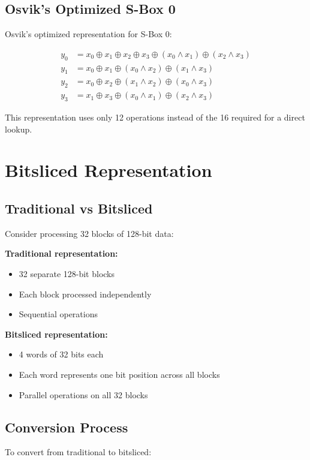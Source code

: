 \documentclass[12pt,a4paper]{article}
\begin{document}
\subsection{Osvik's Optimized S-Box 0}
Osvik's optimized representation for S-Box 0:

\begin{align}
y_0 &= x_0 \oplus x_1 \oplus x_2 \oplus x_3 \oplus (x_0 \land x_1) \oplus (x_2 \land x_3) \\
y_1 &= x_0 \oplus x_1 \oplus (x_0 \land x_2) \oplus (x_1 \land x_3) \\
y_2 &= x_0 \oplus x_2 \oplus (x_1 \land x_2) \oplus (x_0 \land x_3) \\
y_3 &= x_1 \oplus x_3 \oplus (x_0 \land x_1) \oplus (x_2 \land x_3)
\end{align}

This representation uses only 12 operations instead of the 16 required for a direct lookup.

\section{Bitsliced Representation}

\subsection{Traditional vs Bitsliced}
Consider processing 32 blocks of 128-bit data:

\textbf{Traditional representation:}
\begin{itemize}
    \item 32 separate 128-bit blocks
    \item Each block processed independently
    \item Sequential operations
\end{itemize}

\textbf{Bitsliced representation:}
\begin{itemize}
    \item 4 words of 32 bits each
    \item Each word represents one bit position across all blocks
    \item Parallel operations on all 32 blocks
\end{itemize}

\subsection{Conversion Process}
To convert from traditional to bitsliced:
\end{document}
